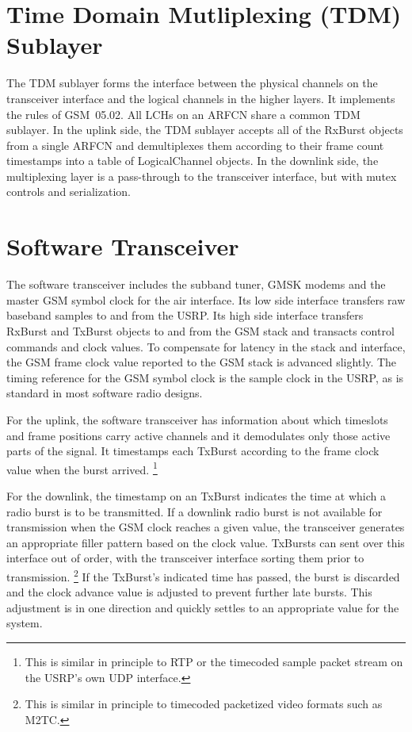 \documentclass[11pt]{book}
\begin{document}
\section{Time Domain Mutliplexing (TDM) Sublayer}
The TDM sublayer forms the interface between the physical channels on the transceiver interface and the logical channels in the higher layers.  It implements the rules of GSM~05.02.  All LCHs on an ARFCN share a common TDM sublayer.
In the uplink side, the TDM sublayer accepts all of the RxBurst objects from a single ARFCN and demultiplexes them according to their frame count timestamps into a table of LogicalChannel objects.
In the downlink side, the multiplexing layer is a pass-through to the transceiver interface, but with mutex controls and serialization.


\section{Software Transceiver}
The software transceiver includes the subband tuner, GMSK modems and the master GSM symbol clock for the air interface. Its low side interface transfers raw baseband samples to and from the USRP. Its high side interface transfers RxBurst and TxBurst objects to and from the GSM stack and transacts control commands and clock values.  To compensate for latency in the stack and interface, the GSM frame clock value reported to the GSM stack is advanced slightly.  The timing reference for the GSM symbol clock is the sample clock in the USRP, as is standard in most software radio designs.

For the uplink, the software transceiver has information about which timeslots and frame positions carry active channels and it demodulates only those active parts of the signal.  It timestamps each TxBurst according to the frame clock value when the burst arrived.%
\footnote{This is similar in principle to RTP or the timecoded sample packet stream on the USRP's own UDP interface.}

For the downlink, the timestamp on an TxBurst indicates the time at which a radio burst is to be transmitted. If a downlink radio burst is not available for transmission when the GSM clock reaches a given value, the transceiver generates an appropriate filler pattern based on the clock value.  TxBursts can sent over this interface out of order, with the transceiver interface sorting them prior to transmission.%
\footnote{This is similar in principle to timecoded packetized video formats such as M2TC.}
If the TxBurst's indicated time has passed, the burst is discarded and the clock advance value is adjusted to prevent further late bursts.  This adjustment is in one direction and quickly settles to an appropriate value for the system.
\end{document}
